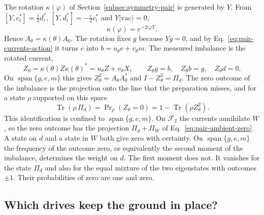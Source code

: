 \documentclass[11pt]{article}
\theoremstyle{definition}
\DeclareMathOperator{\Span}{span}
\DeclareMathOperator{\Tr}{Tr}
\newcommand{\ket}[1]{\lvert #1\rangle}
\begin{document}
The rotation $\kappa(\varphi)$ of Section~\ref{subsec:symmetry-pair} is generated by $Y$. From $[Y,c_i^*]=\tfrac i2d_i^*$, $[Y,d_i^*]=-\tfrac i2c_i^*$ and $Y\ket{\mathrm{vac}}=0$,
\begin{equation}
 \kappa(\varphi)=e^{-2i\varphi Y}.
 \label{eq:pair-currents-rotation}
\end{equation}
Hence $A_\theta=\kappa(\theta)A_0$. The rotation fixes $g$ because $Yg=0$, and by Eq.~\eqref{eq:pair-currents-action} it turns $e$ into $b=u_\theta e+v_\theta m$. The measured imbalance is the rotated current,
\begin{equation}
 Z_\theta=\kappa(\theta)Z\kappa(\theta)^*=u_\theta Z+v_\theta X,\qquad
 Z_\theta g=b,\quad Z_\theta b=g,\quad Z_\theta d=0 .
 \label{eq:pair-currents-readout}
\end{equation}
On $\Span\{g,e,m\}$ this gives $Z_\theta^2=A_\theta A_\theta^*$ and $I-Z_\theta^2=\Pi_d$. The zero outcome of the imbalance is the projection onto the line that the preparation misses, and for a state $\rho$ supported on this space
\begin{equation}
 \Tr(\rho\,\Pi_d)=\Pr\nolimits_\rho(Z_\theta=0)=1-\Tr(\rho Z_\theta^2).
 \label{eq:pair-currents-zero}
\end{equation}
This identification is confined to $\Span\{g,e,m\}$. On $\mathcal F_2$ the currents annihilate $W$, so the zero outcome has the projection $\Pi_d+\Pi_W$ of Eq.~\eqref{eq:pair-ambient-zero}. A state on $d$ and a state in $W$ both give zero with certainty. On $\Span\{g,e,m\}$ the frequency of the outcome zero, or equivalently the second moment of the imbalance, determines the weight on $d$. The first moment does not. It vanishes for the state $\Pi_d$ and also for the equal mixture of the two eigenstates with outcomes $\pm1$. Their probabilities of zero are one and zero.

\subsection{Which drives keep the ground in place?}
\label{subsec:pair-currents-drives}
\end{document}
